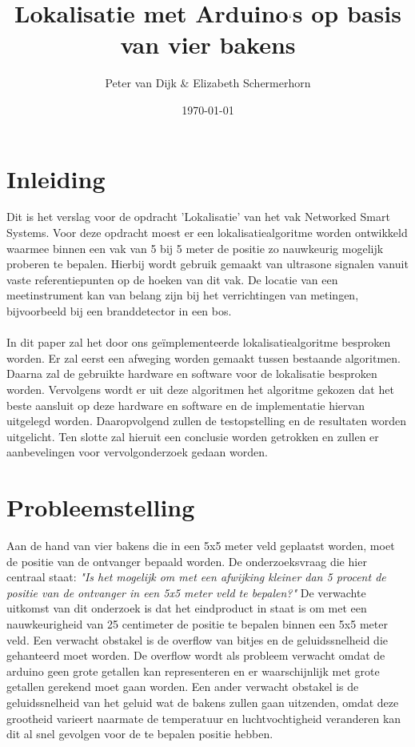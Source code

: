 \documentclass{article}
\author{Peter van Dijk \& Elizabeth Schermerhorn}
\date{\today}
\title{Lokalisatie met Arduino$`$s op basis van vier bakens}
\begin{document}
\maketitle
\newpage
\tableofcontents
\clearpage
\section{Inleiding}
Dit is het verslag voor de opdracht 'Lokalisatie' van het vak Networked Smart Systems. Voor deze opdracht moest er een lokalisatiealgoritme worden ontwikkeld waarmee binnen een vak van 5 bij 5 meter de positie zo nauwkeurig mogelijk proberen te bepalen. Hierbij wordt gebruik gemaakt van ultrasone signalen vanuit vaste referentiepunten op de hoeken van dit vak. De locatie van een meetinstrument kan van belang zijn bij het verrichtingen van metingen, bijvoorbeeld bij een branddetector in een bos. \\
\\
In dit paper zal het door ons ge\"{i}mplementeerde lokalisatiealgoritme besproken worden. Er zal eerst een afweging worden gemaakt tussen bestaande algoritmen. Daarna zal de gebruikte hardware en software voor de lokalisatie besproken worden. Vervolgens wordt er uit deze algoritmen het algoritme gekozen dat het beste aansluit op deze hardware en software en de implementatie hiervan uitgelegd worden. Daaropvolgend zullen de testopstelling en de resultaten worden uitgelicht. Ten slotte zal hieruit een conclusie worden getrokken en zullen er aanbevelingen voor vervolgonderzoek gedaan worden.


\section{Probleemstelling}
Aan de hand van vier bakens die in een 5x5 meter veld geplaatst worden, moet de positie van de ontvanger bepaald worden. De onderzoeksvraag die hier centraal staat: \textit{"Is het mogelijk om met een afwijking kleiner dan 5 procent de positie van de ontvanger in een 5x5 meter veld te bepalen?"}
De verwachte uitkomst van dit onderzoek is dat het eindproduct in staat is om met een nauwkeurigheid van 25 centimeter de positie te bepalen binnen een 5x5 meter veld. Een verwacht obstakel is de overflow van bitjes en de geluidssnelheid die gehanteerd moet worden. De overflow wordt als probleem verwacht omdat de arduino geen grote getallen kan representeren en er waarschijnlijk met grote getallen gerekend moet gaan worden. Een ander verwacht obstakel is de geluidssnelheid van het geluid wat de bakens zullen gaan uitzenden, omdat deze grootheid varieert naarmate de temperatuur en luchtvochtigheid veranderen kan dit al snel gevolgen voor de te bepalen positie hebben.  
\end{document}
